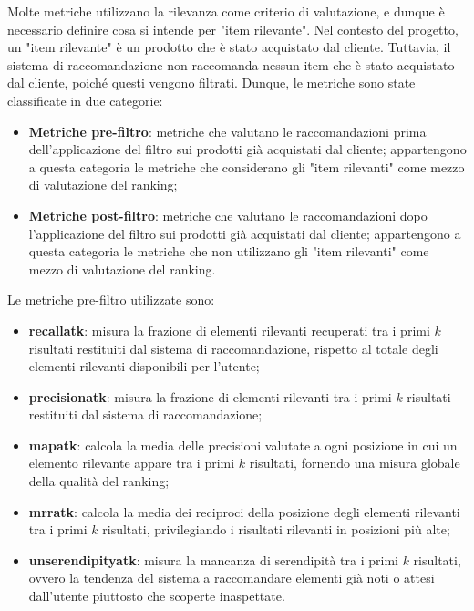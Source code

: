 Molte metriche utilizzano la rilevanza come criterio di valutazione, e dunque è necessario definire cosa si intende per "item rilevante". Nel contesto del progetto, un "item rilevante" è un prodotto che è stato acquistato dal cliente. Tuttavia, il sistema di raccomandazione non raccomanda nessun item che è stato acquistato dal cliente, poiché questi vengono filtrati. Dunque, le metriche sono state classificate in due categorie:
\begin{itemize}
    \item \textbf{Metriche pre-filtro}: metriche che valutano le raccomandazioni prima dell'applicazione del filtro sui prodotti già acquistati dal cliente; appartengono a questa categoria le metriche che considerano gli "item rilevanti" come mezzo di valutazione del ranking;
    \item \textbf{Metriche post-filtro}: metriche che valutano le raccomandazioni dopo l'applicazione del filtro sui prodotti già acquistati dal cliente; appartengono a questa categoria le metriche che non utilizzano gli "item rilevanti" come mezzo di valutazione del ranking.
\end{itemize}

Le metriche pre-filtro utilizzate sono:
\begin{itemize}
    \item \textbf{\gls{recallatk}}: misura la frazione di elementi rilevanti recuperati tra i primi $k$ risultati restituiti dal sistema di raccomandazione, rispetto al totale degli elementi rilevanti disponibili per l'utente;
    \item \textbf{\gls{precisionatk}}: misura la frazione di elementi rilevanti tra i primi $k$ risultati restituiti dal sistema di raccomandazione;
    \item \textbf{\gls{mapatk}}: calcola la media delle precisioni valutate a ogni posizione in cui un elemento rilevante appare tra i primi $k$ risultati, fornendo una misura globale della qualità del ranking;
    \item \textbf{\gls{mrratk}}: calcola la media dei reciproci della posizione degli elementi rilevanti tra i primi $k$ risultati, privilegiando i risultati rilevanti in posizioni più alte;
    \item \textbf{\gls{unserendipityatk}}: misura la mancanza di serendipità tra i primi $k$ risultati, ovvero la tendenza del sistema a raccomandare elementi già noti o attesi dall'utente piuttosto che scoperte inaspettate.
\end{itemize}

